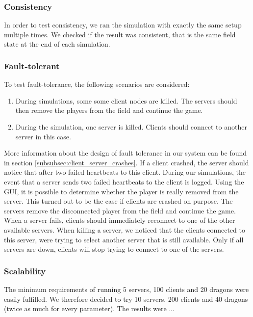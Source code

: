	\subsubsection{Consistency}
	\label{subsubsec:consistency}
		In order to test consistency, we ran the simulation with exactly the same setup multiple times.
		We checked if the result was consistent, that is the same field state at the end of each simulation. 
		
	\subsubsection{Fault-tolerant}
	\label{subsubsec:fault-tolerant}
		To test fault-tolerance, the following scenarios are considered:
		\begin{enumerate}
			\item During simulations, some some client nodes are killed. The servers should then remove the players from the field and continue the game.
			\item During the simulation, one server is killed. Clients should connect to another server in this case.
		\end{enumerate}
		
		More information about the design of fault tolerance in our system can be found in section \ref{subsubsec:client_server_crashes}. If a client crashed, the server should notice that after two failed heartbeats to this client. During our simulations, the event that a server sends two failed heartbeats to the client is logged. Using the GUI, it is possible to determine whether the player is really removed from the server. This turned out to be the case if clients are crashed on purpose. The servers remove the disconnected player from the field and continue the game.\\
		When a server fails, clients should immediately reconnect to one of the other available servers. When killing a server, we noticed that the clients connected to this server, were trying to select another server that is still available. Only if all servers are down, clients will stop trying to connect to one of the servers.
		
	\subsubsection{Scalability}
	\label{subsubsec:scalability}
		The minimum requirements of running 5 servers, 100 clients and 20 dragons were easily fulfilled. We therefore decided to try 10 servers, 200 clients and 40 dragons (twice as much for every parameter). The results were ...
		
